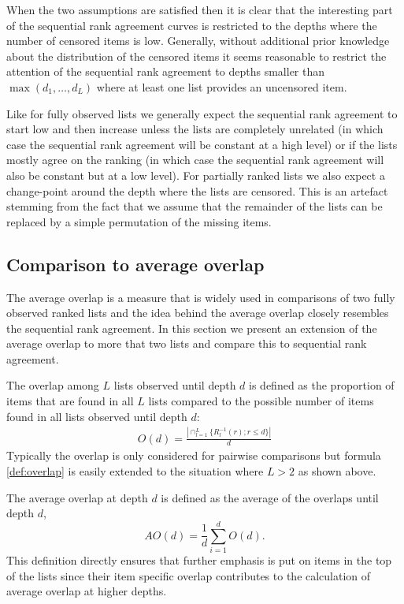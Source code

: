 \documentclass[12pt,a4paper]{article}
\theoremstyle{plain}
\begin{document}
When the two assumptions are satisfied then it is clear that the
interesting part of the sequential rank agreement curves is restricted
to the depths where the number of censored items is
low. Generally, without additional prior knowledge about the
distribution of the censored items it seems reasonable to restrict the
attention of the sequential rank agreement to depths smaller than
$\max(d_1, \ldots, d_L)$ where at least one list provides an
uncensored item.

Like for fully observed lists we generally expect the sequential rank
agreement to start low and then increase unless the lists are
completely unrelated (in which case the sequential rank agreement will
be constant at a high level) or if the lists mostly agree on the
ranking (in which case the sequential rank agreement will also be
constant but at a low level). For partially ranked lists we also
expect a change-point around the depth where the lists are
censored. This is an artefact stemming from the fact that we assume
that the remainder of the lists can be replaced by a simple
permutation of the missing items.



\subsection{Comparison to average overlap}
The average overlap is a measure that is widely used in comparisons of
two fully observed ranked lists \citep{Fagin2003,Webber2010} and the
idea behind the average overlap closely resembles the sequential rank
agreement. In this section we present an extension of the average
overlap to more that two lists and compare this to sequential rank
agreement.

The overlap among $L$ lists observed until depth $d$ is defined as the
proportion of items that are found in all $L$ lists compared to the
possible number of items found in all lists observed until depth $d$:
\begin{align}
  O(d) = \frac{| \cap_{l=1}^L \{R_l^{-1}(r); r\leq d \} |}{d}\label{def:overlap}
\end{align}
Typically the overlap is only considered for pairwise comparisons
\citep{Bar-Ilan2006,Boulesteix2009} but formula \ref{def:overlap}
is easily extended to the situation where $L>2$ as shown above.

The average overlap at depth $d$ is defined as the average of the
overlaps until depth $d$,
\begin{equation}
AO(d) = \frac1d\sum_{i=1}^d O(d).
\end{equation}
This definition directly ensures that further emphasis is put on items
in the top of the lists since their item specific overlap contributes
to the calculation of average overlap at higher depths.
\end{document}
